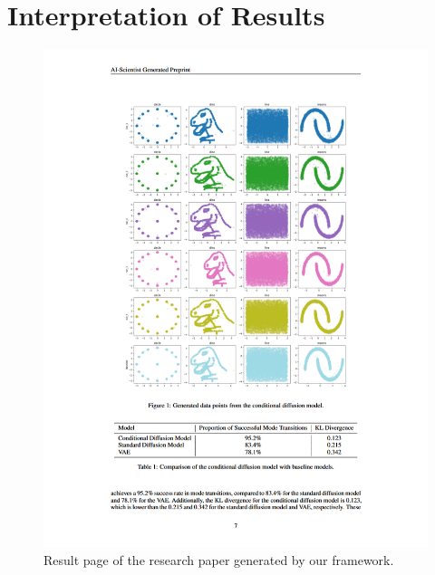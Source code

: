 \section{Interpretation of Results}
\begin{figure}[ht]
    \centering
    \includegraphics[width=\textwidth, height=\textwidth]{images/3.png}
    \caption{Result page of the research paper generated by our framework.}
    \label{fig:output_b} %
\end{figure}

